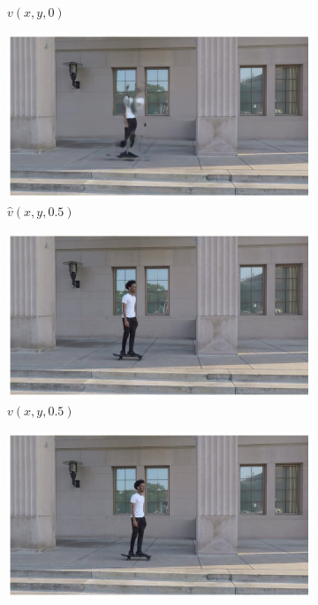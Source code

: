 \documentclass{article}
\begin{document}
\begin{figure}[h]
\begin{subfigure}{0.2\textwidth}
    \caption{$v(x,y,0)$}
\end{subfigure}%
\begin{subfigure}{0.2\textwidth}
	\centering
    \includegraphics[width=1\linewidth]{nd_scene/Skating_out.jpg}
    \caption{$\hat{v}(x,y,0.5)$}
\end{subfigure}%
\begin{subfigure}{0.2\textwidth}
	\centering
    \includegraphics[width=1\linewidth]{nd_scene/Skating_GT.jpg}
    \caption{$v(x,y,0.5)$}
\end{subfigure}%
\begin{subfigure}{0.2\textwidth}
	\centering
    \includegraphics[width=1\linewidth]{nd_scene/Skating_I1.jpg}

\end{subfigure}
\end{figure}
\end{document}
